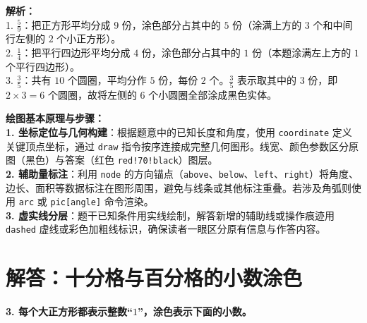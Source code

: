 \vspace{0.6cm}
{\small\color{gray}
\textbf{解析：}\\
1. $\frac{5}{9}$：把正方形平均分成 $9$ 份，涂色部分占其中的 $5$ 份（涂满上方的 $3$ 个和中间行左侧的 $2$ 个小正方形）。\\
2. $\frac{1}{4}$：把平行四边形平均分成 $4$ 份，涂色部分占其中的 $1$ 份（本题涂满左上方的 $1$ 个平行四边形）。\\
3. $\frac{3}{5}$：共有 $10$ 个圆圈，平均分作 $5$ 份，每份 $2$ 个。$\frac{3}{5}$ 表示取其中的 $3$ 份，即 $2 \times 3 = 6$ 个圆圈，故将左侧的 $6$ 个小圆圈全部涂成黑色实体。
}

\vspace{0.8cm}


\vspace{0.6cm}

{\small\color{blue!70!black}
\textbf{绘图基本原理与步骤：}\\
\textbf{1. 坐标定位与几何构建}：根据题意中的已知长度和角度，使用 \texttt{coordinate} 定义关键顶点坐标，通过 \texttt{draw} 指令按序连接成完整几何图形。线宽、颜色参数区分原图（黑色）与答案（红色 \texttt{red!70!black}）图层。\\
\textbf{2. 辅助量标注}：利用 \texttt{node} 的方向锚点（\texttt{above}、\texttt{below}、\texttt{left}、\texttt{right}）将角度、边长、面积等数据标注在图形周围，避免与线条或其他标注重叠。若涉及角弧则使用 \texttt{arc} 或 \texttt{pic[angle]} 命令渲染。\\
\textbf{3. 虚实线分层}：题干已知条件用实线绘制，解答新增的辅助线或操作痕迹用 \texttt{dashed} 虚线或彩色加粗线标识，确保读者一眼区分原有信息与作答内容。
}

\newpage




\newpage

\section{解答：十分格与百分格的小数涂色}

\vspace{0.4cm}

\noindent\textbf{3. 每个大正方形都表示整数“$1$”，涂色表示下面的小数。}

\vspace{0.8cm}

